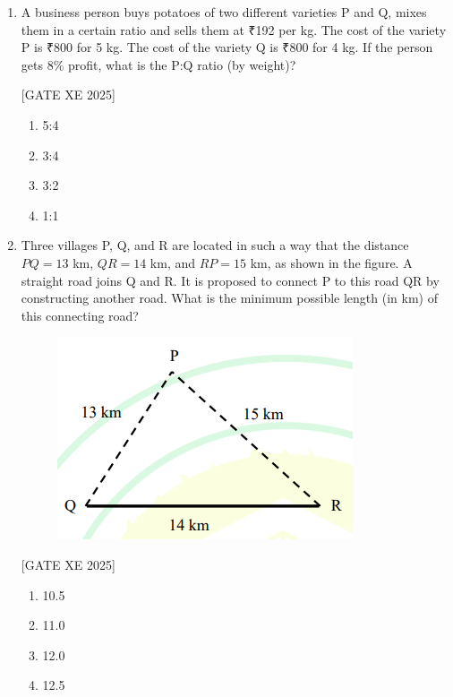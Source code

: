 \documentclass[journal,12pt,onecolumn]{IEEEtran}
\theoremstyle{remark}
\begin{document}
\begin{enumerate}
\item A business person buys potatoes of two different varieties P and Q, mixes them in a certain ratio and sells them at ₹192 per kg.  
The cost of the variety P is ₹800 for 5 kg.  
The cost of the variety Q is ₹800 for 4 kg.  
If the person gets 8\% profit, what is the P:Q ratio (by weight)?

\hfill [GATE XE 2025]

\begin{multicols}{2}
\begin{enumerate}
\item 5:4
\item 3:4
\item 3:2
\item 1:1
\end{enumerate}
\end{multicols}

\item Three villages P, Q, and R are located in such a way that the distance $PQ = 13$ km, $QR = 14$ km, and $RP = 15$ km, as shown in the figure.  
A straight road joins Q and R. It is proposed to connect P to this road QR by constructing another road.  
What is the minimum possible length (in km) of this connecting road?

\begin{figure}[H]
    \centering
    \includegraphics[width=0.5\columnwidth]{figs/fig5.png}
    \caption{}
    \label{fig:placeholder}
\end{figure}

\hfill [GATE XE 2025]

\begin{multicols}{2}
\begin{enumerate}
\item 10.5
\item 11.0
\item 12.0
\item 12.5
\end{enumerate}
\end{multicols}


\end{enumerate}
\end{document}
